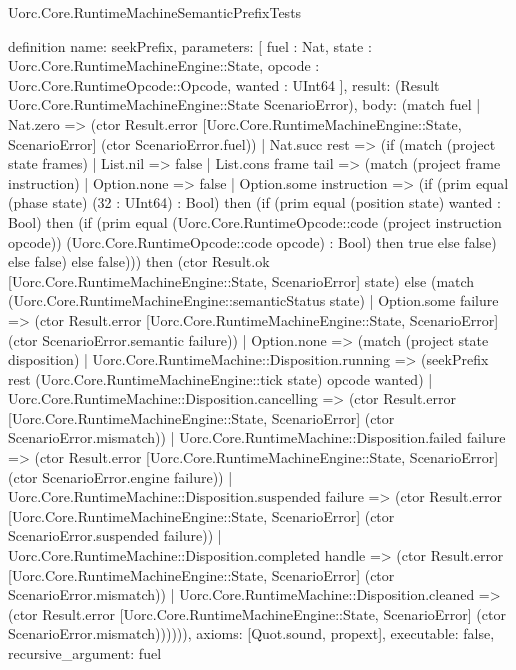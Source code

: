\begin{lexlean}{Uorc.Core.RuntimeMachineSemanticPrefixTests}
\begin{semanticmodule}
definition{
  name: seekPrefix,
  parameters: [
    fuel : Nat,
    state : Uorc.Core.RuntimeMachineEngine::State,
    opcode : Uorc.Core.RuntimeOpcode::Opcode,
    wanted : UInt64
  ],
  result: (Result Uorc.Core.RuntimeMachineEngine::State ScenarioError),
  body: (match fuel
    | Nat.zero => (ctor Result.error [Uorc.Core.RuntimeMachineEngine::State, ScenarioError] (ctor ScenarioError.fuel))
    | Nat.succ rest => (if (match (project state frames)
      | List.nil => false
      | List.cons frame tail => (match (project frame instruction)
        | Option.none => false
        | Option.some instruction => (if (prim equal (phase state) (32 : UInt64) : Bool) then (if (prim equal (position state) wanted : Bool) then (if (prim equal (Uorc.Core.RuntimeOpcode::code (project instruction opcode)) (Uorc.Core.RuntimeOpcode::code opcode) : Bool) then true else false) else false) else false))) then (ctor Result.ok [Uorc.Core.RuntimeMachineEngine::State, ScenarioError] state) else (match (Uorc.Core.RuntimeMachineEngine::semanticStatus state)
      | Option.some failure => (ctor Result.error [Uorc.Core.RuntimeMachineEngine::State, ScenarioError] (ctor ScenarioError.semantic failure))
      | Option.none => (match (project state disposition)
        | Uorc.Core.RuntimeMachine::Disposition.running => (seekPrefix rest (Uorc.Core.RuntimeMachineEngine::tick state) opcode wanted)
        | Uorc.Core.RuntimeMachine::Disposition.cancelling => (ctor Result.error [Uorc.Core.RuntimeMachineEngine::State, ScenarioError] (ctor ScenarioError.mismatch))
        | Uorc.Core.RuntimeMachine::Disposition.failed failure => (ctor Result.error [Uorc.Core.RuntimeMachineEngine::State, ScenarioError] (ctor ScenarioError.engine failure))
        | Uorc.Core.RuntimeMachine::Disposition.suspended failure => (ctor Result.error [Uorc.Core.RuntimeMachineEngine::State, ScenarioError] (ctor ScenarioError.suspended failure))
        | Uorc.Core.RuntimeMachine::Disposition.completed handle => (ctor Result.error [Uorc.Core.RuntimeMachineEngine::State, ScenarioError] (ctor ScenarioError.mismatch))
        | Uorc.Core.RuntimeMachine::Disposition.cleaned => (ctor Result.error [Uorc.Core.RuntimeMachineEngine::State, ScenarioError] (ctor ScenarioError.mismatch)))))),
  axioms: [Quot.sound, propext],
  executable: false,
  recursive_argument: fuel
}


\end{semanticmodule}
\end{lexlean}
